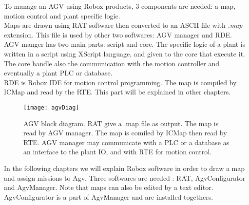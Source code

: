 
To manage an AGV using Robox products, 3 components are needed: a map, motion control and plant specific logic.\\

Maps are drawn using RAT software then converted to an ASCII file with \textit{.map} extension. This file is used by other two softwares: AGV manager and RDE.\\

AGV manger has two main parts: script and core. The specific logic of a plant is written in a script using XScript language, and given to the core that execute it. The core handle also the communication with the motion controller and eventually a plant PLC or database.\\

RDE is Robox IDE for motion control programming. The map is compiled by ICMap and read by the RTE. This part will be explained in other chapters.


\begin{figure}[h]
	\centering\texttt{[image: agvDiag]}
	\caption{AGV block diagram. RAT give a .map file as output. The map is read by AGV manager. The map is comiled by ICMap then read by RTE. AGV manager may communicate with a PLC or a database as an interface to the plant IO, and with RTE for motion control.}
	\label{fig:refAgvDiag}
\end{figure}

In the following chapters we will explain Robox software in order to draw a map and assign missions to Agv. Three softwares are needed : RAT, AgvConfigurator and AgvManager. Note that maps can also be edited by a text editor. AgvConfigurator is a part of AgvManager and are installed togethers.

